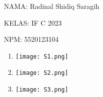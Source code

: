 \documentclass[10pt,a4paper]{article}
\date{}
\newcommand{\lstinputwithcaption}[2]{%
}
\begin{document}
NAMA: Radinal Shidiq Saragih

KELAS: IF C 2023

NPM: 5520123104

\begin{enumerate}

  \item 

    \begin{multicols}{2}

      \begin{center}

        \lstinputwithcaption{./code/src/soal1/Main.java}{Main.java}

        \lstinputwithcaption{./code/src/soal1/Hewan.java}{Main.java}

        \columnbreak

        \lstinputwithcaption{./code/src/soal1/HewanKakiDua.java}{HewanKakiDua.java}
        
        \lstinputwithcaption{./code/src/soal1/HewanKakiEmpat.java}{HewanKakiEmpat.java}

        \lstinputwithcaption{./code/src/soal1/HewanKakiEnam.java}{HewanKakiEnam.java}

        \lstinputwithcaption{./code/src/soal1/HewanKakiDelapan.java}{HewanKakiDelapan.java}

        \texttt{[image: S1.png]}

      \end{center}

    \end{multicols}

    \newpage

  \item 

      \begin{center}

        \lstinputwithcaption{./code/src/soal2/Main.java}{Main.java}

        \texttt{[image: S2.png]}

      \end{center}


  \item 

      \begin{center}

        \lstinputwithcaption{./code/src/soal3/Kubus.java}{Kubus.java}

        \texttt{[image: S3.png]}


\end{center}
\end{enumerate}
\end{document}
